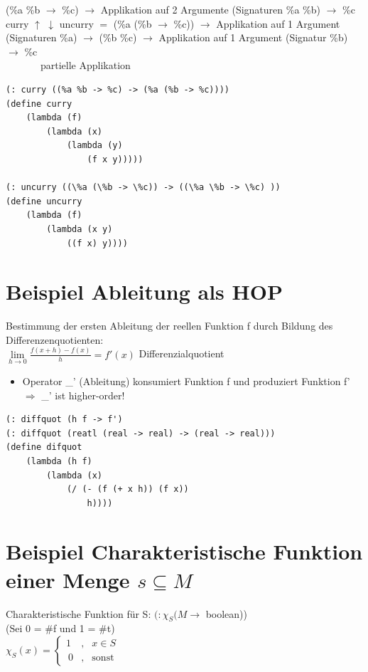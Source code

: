 \documentclass[a4paper, 20pt, openany]{book}
\begin{document}
(\%a \%b $\rightarrow$ \%c) 		$\rightarrow$	Applikation auf 2 Argumente (Signaturen \%a \%b) $\rightarrow$ \%c\\
curry $\uparrow$ $\downarrow$ uncurry										$=$
(\%a (\%b $\rightarrow$ \%c)) 		$\rightarrow$	Applikation auf 1 Argument (Signaturen \%a) $\rightarrow$ (\%b \%c) $\rightarrow$ Applikation auf 1 Argument (Signatur \%b) $\rightarrow$ \%c \\
\ \ \ \ \ \ \ partielle Applikation

\begin{lstlisting}
(: curry ((%a %b -> %c) -> (%a (%b -> %c))))
(define curry
	(lambda (f)
		(lambda (x)
			(lambda (y)
				(f x y)))))

(: uncurry ((\%a (\%b -> \%c)) -> ((\%a \%b -> \%c) ))
(define uncurry
	(lambda (f)
		(lambda (x y)
			((f x) y))))
\end{lstlisting}

\section{Beispiel Ableitung als HOP}
Bestimmung der ersten Ableitung der reellen Funktion f durch Bildung des Differenzenquotienten:\\
$\lim \limits_{h \rightarrow 0} \frac{f(x+h) - f(x)}{h} = f'(x)$ Differenzialquotient\\
\begin{itemize}
\item Operator \_' (Ableitung) konsumiert Funktion f und produziert Funktion f' $\Rightarrow$ \_' ist higher-order!
\end{itemize}

\begin{lstlisting}
(: diffquot (h f -> f')
(: diffquot (reatl (real -> real) -> (real -> real)))
(define difquot
	(lambda (h f)
		(lambda (x)
			(/ (- (f (+ x h)) (f x))
				h))))
\end{lstlisting}

\section{Beispiel Charakteristische Funktion einer Menge $s \subseteq M$}
Charakteristische Funktion für S: $(: \chi_S (M \rightarrow$ boolean))\\
(Sei 0 = \#f und 1 = \#t)\\
$\chi_{S}(x) =\left\{\begin{array}{rcl}1 &,& x\in S\\\ 0  &,& \mathrm{sonst}\end{array}\right.$
\end{document}
